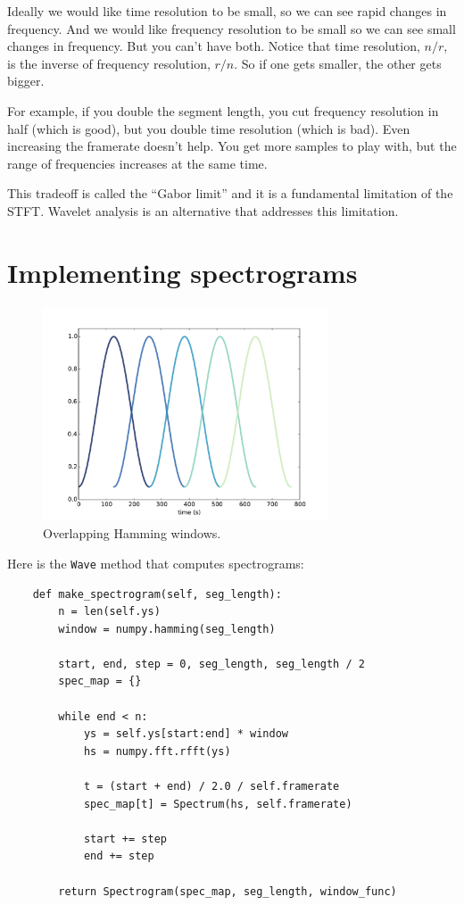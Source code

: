 \documentclass[12pt]{book}
\begin{document}
Ideally we would like time resolution to be small, so we can see rapid
changes in frequency.  And we would like frequency resolution to be
small so we can see small changes in frequency.  But you can't have
both.  Notice that time resolution, $n/r$, is the inverse of frequency
resolution, $r/n$.  So if one gets smaller, the other gets bigger.

For example, if you double the segment length, you cut frequency
resolution in half (which is good), but you double time resolution
(which is bad).  Even increasing the framerate doesn't help.  You get
more samples to play with, but the range of frequencies increases at
the same time.

This tradeoff is called the ``Gabor limit'' and it is a fundamental
limitation of the STFT.  Wavelet analysis is an alternative that
addresses this limitation.


\section{Implementing spectrograms}

\begin{figure}
\centerline{\includegraphics[height=2.5in]{figs/windowing3.pdf}}
\caption{Overlapping Hamming windows.}
\label{fig.windowing3}
\end{figure}

Here is the {\tt Wave} method that computes spectrograms:

\begin{verbatim}
    def make_spectrogram(self, seg_length):
        n = len(self.ys)
        window = numpy.hamming(seg_length)

        start, end, step = 0, seg_length, seg_length / 2
        spec_map = {}

        while end < n:
            ys = self.ys[start:end] * window
            hs = numpy.fft.rfft(ys)

            t = (start + end) / 2.0 / self.framerate
            spec_map[t] = Spectrum(hs, self.framerate)

            start += step
            end += step

        return Spectrogram(spec_map, seg_length, window_func)
\end{verbatim}
\end{document}
